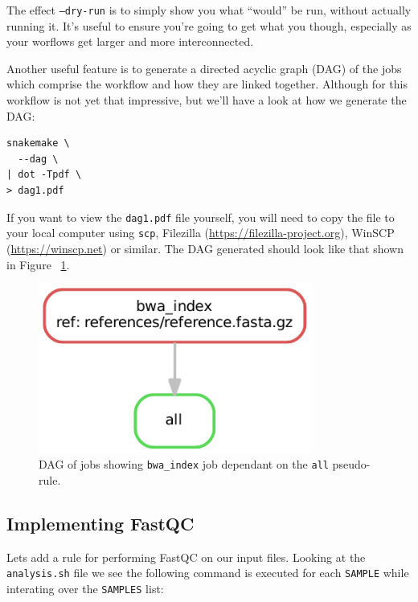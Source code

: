 The effect \texttt{--dry-run} is to simply show you what ``would'' be run, without actually running it.
It's useful to ensure you're going to get what you though, especially as your worflows get larger and more interconnected.

Another useful feature is to generate a directed acyclic graph (DAG) of the jobs which comprise the workflow and how they are linked together.
Although for this workflow is not yet that impressive, but we'll have a look at how we generate the DAG:

\begin{lstlisting}
snakemake \
  --dag \
| dot -Tpdf \
> dag1.pdf
\end{lstlisting}

\begin{warning}

If you want to view the \texttt{dag1.pdf} file yourself, you will need to copy the file to your local computer using \texttt{scp}, Filezilla (\url{https://filezilla-project.org}), WinSCP (\url{https://winscp.net}) or similar.
The DAG generated should look like that shown in Figure ~\ref{fig:dag1}.

\end{warning}

\begin{figure}[H]
\centering
\includegraphics[width=0.8\textwidth]{handout/dag1.pdf}
\caption{DAG of jobs showing \texttt{bwa\_index} job dependant on the \texttt{all} pseudo-rule.}
\label{fig:dag1}
\end{figure}

\newpage
\subsection{Implementing FastQC}

Lets add a rule for performing FastQC on our input files.
Looking at the \texttt{analysis.sh} file we see the following command is executed for each \texttt{SAMPLE} while interating over the \texttt{SAMPLES} list:


